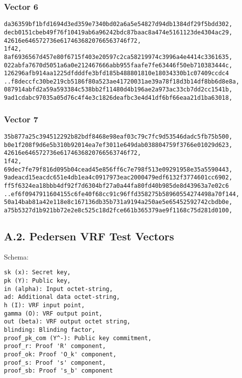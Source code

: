 \documentclass[
]{article}
\begin{document}
\hypertarget{vector-6}{%
\subsubsection{Vector 6}\label{vector-6}}

\begin{verbatim}
da36359bf1bfd1694d3ed359e7340bd02a6a5e54827d94db1384df29f5bdd302,
decb0151cbeb49f76f10419ab6a96242bdc87baac8a474e5161123de4304ac29,
42616e646572736e6174636820766563746f72,
1f42,
8af6936567d457e80f6715f403e20597c2ca58219974c3996a4e4414c3361635,
022abfa7670d5051a6a0e212467666abb955faafe7fe63446f50eb710383444c,
126296afb914aa1225dfdddfe3bfd185b488801810e18034330b1c07409ccdc4
..f8deccfc30be219cb5186f80a523ae41720031ae39a78f18d3b14df8bb6d8e8a,
087914abfd2a59a593384c538bb2f11480d4b196ae2a973ac33cb7dd2cc1541b,
9ad1cdabc97035a05d76c4f4e3c1826deafbc3e4d41df6bf66eaa21d1ba63018,
\end{verbatim}

\hypertarget{vector-7}{%
\subsubsection{Vector 7}\label{vector-7}}

\begin{verbatim}
35b877a25c394512292b82bdf8468e98eaf03c79c7fc9d53546dadc5fb75b500,
b0e1f208f9d6e5b310b92014ea7ef3011e649dab038804759f3766e01029d623,
42616e646572736e6174636820766563746f72,
1f42,
69dec7fe79f816d095b04cead45e856ff6c7e798f513e09291958e35a5590443,
9adeacd15eacdc651e4db1ea4c0917973eac2000479edf6132f3774601cc6902,
ff5f6324ea18bbb4df92f7d6304bf27a0a44fa80fd40b985de8d43963a7e02c6
..ef6f0947911604155c6fe40f68cc91c96ffd358275b58960554274498a70f144,
50a14bab81a42e118e8c167136db35b731a9194a250ae5e65452592742cbdb0e,
a75b5327d1b921bb72e2e8c525c18d2fce661b365379ae9f1168c75d281d0100,
\end{verbatim}

\hypertarget{a.2.-pedersen-vrf-test-vectors}{%
\subsection{A.2. Pedersen VRF Test
Vectors}\label{a.2.-pedersen-vrf-test-vectors}}

Schema:

\begin{verbatim}
sk (x): Secret key,
pk (Y): Public key,
in (alpha): Input octet-string,
ad: Additional data octet-string,
h (I): VRF input point,
gamma (O): VRF output point,
out (beta): VRF output octet string,
blinding: Blinding factor,
proof_pk_com (Y^-): Public key commitment,
proof_r: Proof 'R' component,
proof_ok: Proof 'O_k' component,
proof_s: Proof 's' component,
proof_sb: Proof 's_b' component
\end{verbatim}
\end{document}
